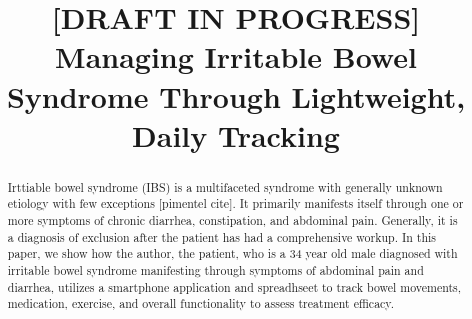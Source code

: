 \documentclass[conference]{IEEEtran}
\begin{document}
%
\title{[DRAFT IN PROGRESS] Managing Irritable Bowel Syndrome Through Lightweight, Daily Tracking}


\author{
}





\maketitle

\begin{abstract}
Irttiable bowel syndrome (IBS) is a multifaceted syndrome with generally unknown etiology with few exceptions [pimentel cite].  It primarily manifests itself through one or more symptoms of chronic diarrhea, constipation, and abdominal pain.  Generally, it is a diagnosis of exclusion after the patient has had a comprehensive workup. In this paper, we show how the author, the patient, who is a 34 year old male diagnosed with irritable bowel syndrome  manifesting through symptoms of abdominal pain and diarrhea, utilizes a smartphone application and spreadhseet to track bowel movements, medication, exercise, and overall functionality to assess treatment efficacy.
\end{abstract}




%
\IEEEpeerreviewmaketitle
\end{document}
